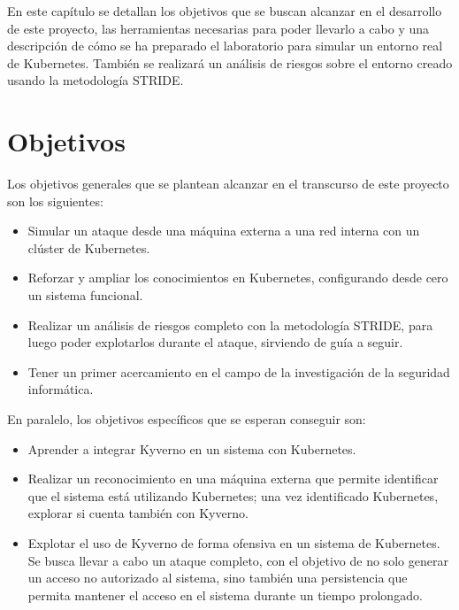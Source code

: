 \documentclass[12pt,twoside,titlepage]{report}
\begin{document}
En este capítulo se detallan los objetivos que se buscan alcanzar en el desarrollo de este proyecto, las herramientas necesarias para poder llevarlo a cabo y una descripción de cómo se ha preparado el laboratorio para simular un entorno real de Kubernetes. También se realizará un análisis de riesgos sobre el entorno creado usando la metodología STRIDE.

\section{Objetivos} \label{chap:objetivos}

Los objetivos generales que se plantean alcanzar en el transcurso de este proyecto son los siguientes:

\begin{itemize}

\item Simular un ataque desde una máquina externa a una red interna con un clúster de Kubernetes.

\item Reforzar y ampliar los conocimientos en Kubernetes, configurando desde cero un sistema funcional.

\item Realizar un análisis de riesgos completo con la metodología STRIDE, para luego poder explotarlos durante el ataque, sirviendo de guía a seguir.

\item Tener un primer acercamiento en el campo de la investigación de la seguridad informática.

\end{itemize}

En paralelo, los objetivos específicos que se esperan conseguir son:

\begin{itemize}

\item Aprender a integrar Kyverno en un sistema con Kubernetes.

\item Realizar un reconocimiento en una máquina externa que permite identificar que el sistema está utilizando Kubernetes; una vez identificado Kubernetes, explorar si cuenta también con Kyverno.

\item Explotar el uso de Kyverno de forma ofensiva en un sistema de Kubernetes. Se busca llevar a cabo un ataque completo, con el objetivo de no solo generar un acceso no autorizado al sistema, sino también una persistencia que permita mantener el acceso en el sistema durante un tiempo prolongado.

\end{itemize}
\end{document}
